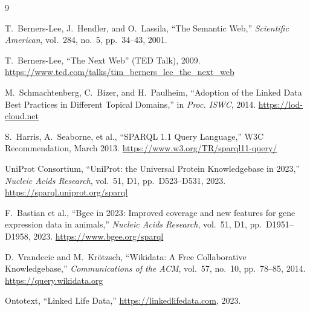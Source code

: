 \documentclass[12pt,a4paper]{article}
\begin{document}
\newpage
\begin{thebibliography}{9}

T.~Berners-Lee, J.~Hendler, and O.~Lassila,
``The Semantic Web,''
\textit{Scientific American}, vol.~284, no.~5, pp.~34--43, 2001.

T.~Berners-Lee,
``The Next Web'' (TED Talk), 2009.
\url{https://www.ted.com/talks/tim_berners_lee_the_next_web}

M.~Schmachtenberg, C.~Bizer, and H.~Paulheim,
``Adoption of the Linked Data Best Practices in Different Topical Domains,''
in \textit{Proc. ISWC}, 2014.
\url{https://lod-cloud.net}

S.~Harris, A.~Seaborne, et al.,
``SPARQL 1.1 Query Language,'' W3C Recommendation, March 2013.
\url{https://www.w3.org/TR/sparql11-query/}

UniProt Consortium,
``UniProt: the Universal Protein Knowledgebase in 2023,''
\textit{Nucleic Acids Research}, vol.~51, D1, pp.~D523--D531, 2023.
\url{https://sparql.uniprot.org/sparql}

F.~Bastian et al.,
``Bgee in 2023: Improved coverage and new features for gene expression
data in animals,''
\textit{Nucleic Acids Research}, vol.~51, D1, pp.~D1951--D1958, 2023.
\url{https://www.bgee.org/sparql}

D.~Vrandecic and M.~Krötzsch,
``Wikidata: A Free Collaborative Knowledgebase,''
\textit{Communications of the ACM}, vol.~57, no.~10, pp.~78--85, 2014.
\url{https://query.wikidata.org}

Ontotext,
``Linked Life Data,''
\url{https://linkedlifedata.com}, 2023.

\end{thebibliography}
\end{document}

